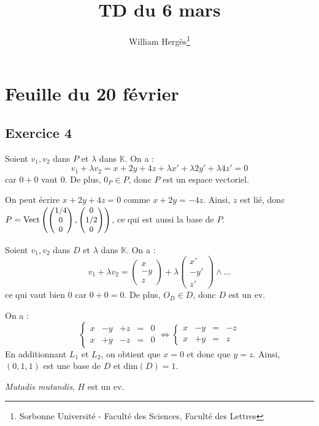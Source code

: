 \documentclass[a4paper, titlepage]{article}
\title{TD du 6 mars}
\author{William Hergès\thanks{Sorbonne Université - Faculté des Sciences, Faculté des Lettres}}
\begin{document}
	\maketitle
	\section{Feuille du 20 février}
	\subsection*{Exercice 4}
	Soient $v_1,v_2$ dans $P$ et $\lambda$ dans $\mathbb{K}$. On a :
	$$ v_1+\lambda v_2 = x+2y+4z+\lambda x'+\lambda2y'+\lambda4z' = 0 $$
	car $0+0$ vaut $0$. De plus, $0_P\in P$, donc $P$ est un espace vectoriel.

	On peut écrire $x+2y+4z=0$ comme $x+2y=-4z$. Ainsi, $z$ est lié, donc $P=\mathrm{Vect}\left( \small\begin{pmatrix} 1/4\\0\\0 \end{pmatrix} ,\small\begin{pmatrix} 0\\1/2\\0 \end{pmatrix} \right)$, ce qui est aussi la base de $P$.

	Soient $v_1,v_2$ dans $D$ et $\lambda$ dans $\mathbb{K}$. On a :
	$$ v_1+\lambda v_2 = \begin{pmatrix} x\\-y\\z \end{pmatrix} + \lambda\begin{pmatrix} x'\\-y'\\z' \end{pmatrix} \land\ldots $$
	ce qui vaut bien $0$ car $0+0=0$. De plus, $O_D\in D$, donc $D$ est un ev.

	On a :
	$$ \left\{\begin{matrix} x&-y&+z&=&0\\ x&+y&-z&=&0 \end{matrix} \right.\iff \left\{\begin{matrix} x&-y&=&-z\\ x&+y&=&z \end{matrix} \right. $$
	En additionnant $L_1$ et $L_2$, on obtient que $x=0$ et donc que $y=z$. Ainsi, $(0,1,1)$ est une base de $D$ et $\mathrm{dim}(D) = 1$.

	\textit{Mutadis mutandis}, $H$ est un ev.
\end{document}
